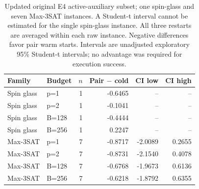 \begin{table}[tb]
\centering\small
\begin{tabular}{llrrrr}
\hline
Family & Budget & $n$ & Pair $-$ cold & CI low & CI high \\
\hline
Spin glass & p=1 & 1 & -0.6465 & -- & -- \\
Spin glass & p=2 & 1 & -0.1041 & -- & -- \\
Spin glass & B=128 & 1 & -0.4444 & -- & -- \\
Spin glass & B=256 & 1 & 0.2247 & -- & -- \\
Max-3SAT & p=1 & 7 & -0.8717 & -2.0089 & 0.2655 \\
Max-3SAT & p=2 & 7 & -0.8731 & -2.1540 & 0.4078 \\
Max-3SAT & B=128 & 7 & -0.6768 & -1.9673 & 0.6136 \\
Max-3SAT & B=256 & 7 & -0.6218 & -1.8792 & 0.6355 \\
\hline
\end{tabular}
\caption{Updated original E4 active-auxiliary subset; one spin-glass and seven Max-3SAT instances. A Student-t interval cannot be estimated for the single spin-glass instance. All three restarts are averaged within each raw instance. Negative differences favor pair warm starts. Intervals are unadjusted exploratory 95\% Student-t intervals; no advantage was required for execution success.}
\label{tab:original-e4-selector-rerun-v3}
\end{table}
